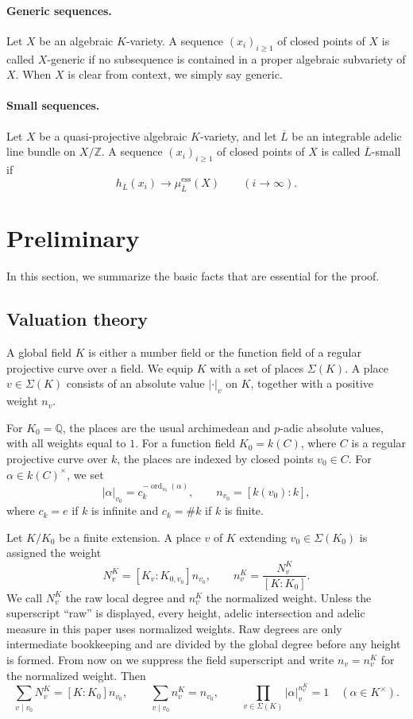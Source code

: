 \documentclass[10pt,a4paper]{amsart}
\theoremstyle{plain}
\theoremstyle{plain}
\numberwithin{equation}{section}
\begin{document}
\paragraph{Generic sequences.}
Let \(X\) be an algebraic \(K\)-variety.  A sequence
\((x_i)_{i\geq 1}\) of closed points of \(X\) is called \(X\)-generic if no
subsequence is contained in a proper algebraic subvariety of \(X\).  When \(X\)
is clear from context, we simply say generic.

\paragraph{Small sequences.}
Let \(X\) be a quasi-projective algebraic \(K\)-variety, and let
\(\overline L\) be an integrable adelic line bundle on \(X/\mathbb Z\).  A
sequence \((x_i)_{i\geq1}\) of closed points of \(X\) is called
\(\overline L\)-small if
\[
h_{\overline{L}}(x_i)\to\mu^{\mathrm{ess}}_{\overline{L}}(X)
\qquad (i\to \infty).
\]

\section{Preliminary}
In this section, we summarize the basic facts that are essential for the proof.
\subsection{Valuation theory}
A global field \(K\) is either a number field or the function field of a
regular projective curve over a field.  We equip \(K\) with a set of places
\(\Sigma(K)\).  A place \(v\in\Sigma(K)\) consists of an absolute value
\(|\cdot|_v\) on \(K\), together with a positive weight \(n_v\).

For \(K_0=\mathbb Q\), the places are the usual archimedean and \(p\)-adic
absolute values, with all weights equal to \(1\).  For a function field
\(K_0=k(C)\), where \(C\) is a regular projective curve over \(k\), the places
are indexed by closed points \(v_0\in C\).  For
\(\alpha\in k(C)^\times\), we set
\[
|\alpha|_{v_0}=c_k^{-\operatorname{ord}_{v_0}(\alpha)},
\qquad
n_{v_0}=[k(v_0):k],
\]
where \(c_k=e\) if \(k\) is infinite and \(c_k=\#k\) if \(k\) is finite.

Let \(K/K_0\) be a finite extension.  A place \(v\) of \(K\) extending
\(v_0\in\Sigma(K_0)\) is assigned the weight
\[
N^{K}_{v}=[K_v:K_{0,v_0}]n_{v_0},
\qquad
n^{K}_{v}=\frac{N^{K}_{v}}{[K:K_0]}.
\]
We call \(N^{K}_{v}\) the raw local degree and \(n^{K}_{v}\) the normalized
weight.  Unless the superscript ``raw'' is displayed, every height, adelic
intersection and adelic measure in this paper uses normalized weights.  Raw
degrees are only intermediate bookkeeping and are divided by the global
degree before any height is formed.  From now on we suppress the field
superscript and write \(n_v=n_v^K\) for the normalized weight.
Then
\[
\sum_{v\mid v_0}N^{K}_{v}=[K:K_0]n_{v_0},
\qquad
\sum_{v\mid v_0}n^{K}_{v}=n_{v_0},
\qquad
\prod_{v\in\Sigma(K)}|\alpha|_v^{n^{K}_{v}}=1
\quad(\alpha\in K^\times).
\]
\end{document}
